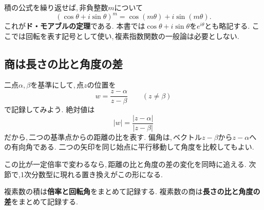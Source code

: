 積の公式を繰り返せば,\,非負整数$m$について
\[
 (\cos\theta+i\sin\theta)^m
 =\cos(m\theta)+i\sin(m\theta).
\]
これが\textbf{ド・モアブルの定理}である.
本書では$\cos\theta+i\sin\theta$を$e^{i\theta}$とも略記する.
ここでは回転を表す記号として使い,\,複素指数関数の一般論は必要としない.

\subsection{商は長さの比と角度の差}

二点$\alpha,\beta$を基準にして,\,点$z$の位置を
\[
 w=\frac{z-\alpha}{z-\beta}\qquad(z\ne\beta)
\]
で記録してみよう.
絶対値は
\[
 |w|=\frac{|z-\alpha|}{|z-\beta|}
\]
だから,\,二つの基準点からの距離の比を表す.
偏角は,\,ベクトル$z-\beta$から$z-\alpha$への有向角である.
二つの矢印を同じ始点に平行移動して角度を比較してもよい.
\NewFigRatio

この比が一定倍率で変わるなら,\,距離の比と角度の差の変化を同時に追える.
次節で,1次分数型に現れる置き換えがこの形になる.

\begin{bookpoint}
複素数の積は\textbf{倍率と回転角}をまとめて記録する.
複素数の商は\textbf{長さの比と角度の差}をまとめて記録する.
\end{bookpoint}
